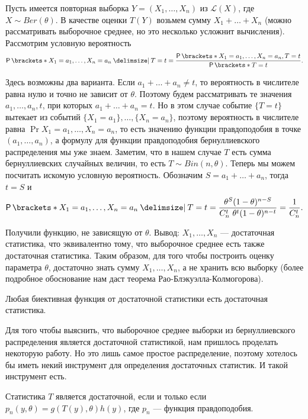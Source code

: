 \begin{example}
    Пусть имеется повторная выборка $Y = (X_1, \ldots, X_n)$ из $\mathcal{L}(X)$, где $X \sim Ber(\theta)$. В качестве оценки $T(Y)$ возьмем сумму $X_1 + \ldots + X_n$ (можно рассматривать выборочное среднее, но это несколько усложнит вычисления). Рассмотрим условную вероятность
    \[
        \Pr{X_1 = a_1, \ldots, X_n = a_n \given T = t} = \frac{\Pr{X_1 = a_1, \ldots, X_n = a_n, T = t}}{\Pr{T = t}}.
    \]

    Здесь возможны два варианта. Если $a_1 + \ldots + a_n \neq t$, то вероятность в числителе равна нулю и точно не зависит от $\theta$. Поэтому будем рассматривать те значения $a_1, \ldots, a_n, t$, при которых $a_1 + \ldots + a_n = t$. Но в этом случае событие $\{T = t\}$ вытекает из событий $\{X_1 = a_1\}, \ldots, \{X_n = a_n\}$, поэтому вероятность в числителе равна $\Pr{X_1 = a_1, \ldots, X_n = a_n}$, то есть значению функции правдоподобия в точке $(a_1, \ldots, a_n)$, а формулу для функции правдоподобия бернуллиевского распределения мы уже знаем. Заметим, что в нашем случае $T$ есть сумма бернуллиевских случайных величин, то есть $T \sim Bin(n, \theta)$. Теперь мы можем посчитать искомую условную вероятность. Обозначим $S = a_1 + \ldots + a_n$, тогда $t = S$ и
    \[
        \Pr{X_1 = a_1, \ldots, X_n = a_n \given T = t} = \dfrac{\theta^S(1-\theta)^{n-S}}{C_n^t\  \theta^t (1-\theta)^{n-t}} = \dfrac{1}{C_n^t}.
    \]

    Получили функцию, не зависящую от $\theta$. Вывод: $X_1, \ldots, X_n$ --- достаточная статистика, что эквивалентно тому, что выборочное среднее есть также достаточная статистика. Таким образом, для того чтобы построить оценку параметра $\theta$, достаточно знать сумму $X_1, \ldots, X_n$, а не хранить всю выборку (более подробное обоснование нам даст теорема Рао-Блэкуэлла-Колмогорова).
\end{example}

\begin{remark}
    Любая биективная функция от достаточной статистики есть достаточная статистика.
\end{remark}

Для того чтобы выяснить, что выборочное среднее выборки из бернуллиевского распределения является достаточной статистикой, нам пришлось проделать некоторую работу. Но это лишь самое простое распределение, поэтому хотелось бы иметь некий инструмент для определения достаточных статистик. И такой инструмент есть.

\begin{theorem}
    Статистика $T$ является достаточной, если и только если $p_n(y, \theta) = g(T(y), \theta)h(y)$, где $p_n$ --- функция правдоподобия.
\end{theorem}

